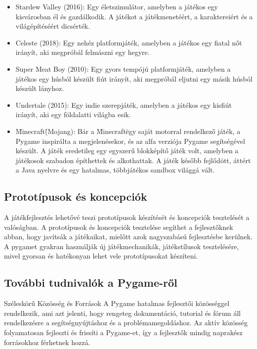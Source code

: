\begin{itemize}
    
    \item Stardew Valley (2016): Egy életszimulátor, amelyben a játékos egy kisvárosban él és gazdálkodik. A játékot a játékmenetéért, a karaktereiért és a világépítéséért dicsérték.
    
    \item Celeste (2018): Egy nehéz platformjáték, amelyben a játékos egy fiatal nőt irányít, aki megpróbál felmászni egy hegyre.
    
    \item Super Meat Boy (2010): Egy gyors tempójú platformjáték, amelyben a játékos egy húsból készült fiút irányít, aki megpróbál eljutni egy másik húsból készült lányhoz.
    
    \item Undertale (2015): Egy indie szerepjáték, amelyben a játékos egy kisfiút irányít, aki egy földalatti világba esik.


    \item\"Minecraft\" (Mojang): Bár a \"Minecraft\" egy saját motorral rendelkező játék, a Pygame inspirálta a megjelenésekor, és az alfa verziója Pygame segítségével készült.  A játék eredetileg egy egyszerű blokképítő játék volt, amelyben a játékosok szabadon építhettek és alkothattak. A játék később fejlődött, áttért a Java nyelvre és egy hatalmas, többjátékos sandbox világgá vált.
    
\end{itemize}


\subsection{Prototípusok és koncepciók}
A játékfejlesztés lehetővé teszi prototípusok készítését és koncepciók tesztelését a valóságban. A prototípusok és koncepciók tesztelése segíthet a fejlesztőknek abban, hogy javítsák a játékaikat, mielőtt azok nagyszabású fejlesztésbe kerülnek. A pygamet gyakran használják új játékmechanikák, játékstílusok tesztelésére, mivel gyorsan és hatékonyan lehet vele prototípusokat készíteni.

\subsection{További tudnivalók a Pygame-ről}

Széleskörű Közösség és Források
A Pygame hatalmas fejlesztői közösséggel rendelkezik, ami azt jelenti, hogy rengeteg dokumentáció, tutorial és fórum áll rendelkezésre a segítségnyújtáshoz és a problémamegoldáshoz. Az aktív közösség folyamatosan fejleszti és frissíti a Pygame-et, így a fejlesztők mindig naprakész forrásokhoz férhetnek hozzá.


